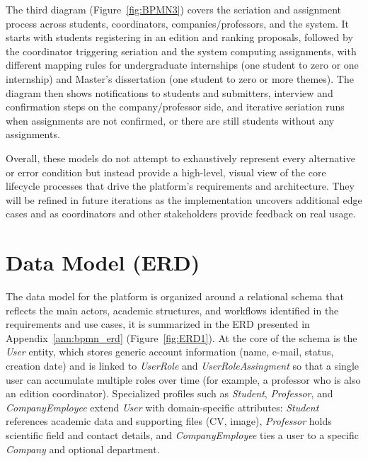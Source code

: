     {
        The third diagram (Figure~\ref{fig:BPMN3}) covers the seriation and assignment process across students, coordinators, companies/professors,
        and the system. 
        It starts with students registering in an edition and ranking proposals, followed by the coordinator triggering
        seriation and the system computing assignments, with different mapping rules for undergraduate internships 
        (one student to zero or one internship) and Master's dissertation (one student to zero or more themes).
        The diagram then shows notifications to students and submitters, interview and confirmation steps on the
        company/professor side, and iterative seriation runs when assignments are not confirmed, or there are still students
        without any assignments.
    }

    {
        Overall, these  models do not attempt to exhaustively represent every alternative or error condition but instead
        provide a high-level, visual view of the core lifecycle processes that drive the platform's requirements and architecture.
        They will be refined in future iterations as the implementation uncovers additional edge cases and 
        as coordinators and other stakeholders provide feedback on real usage. 
    }

\section{Data Model (ERD)}
\label{sec:sol_erd}
\ntindex[Template]{}
    {
        The data model for the platform is organized around a relational schema that reflects the main actors, academic structures, and workflows
        identified in the requirements and use cases, it is summarized in the \gls{ERD} presented in Appendix~\ref{ann:bpmn_erd} (Figure~\ref{fig:ERD1}).
        At the core of the schema is the \textit{User} entity, which stores generic account information (name, e-mail, status, creation date)
        and is linked to \textit{UserRole} and \textit{UserRoleAssingment} so that a single user can accumulate multiple roles over time 
        (for example, a professor who is also an edition coordinator). 
        Specialized profiles such as \textit{Student}, \textit{Professor}, and \textit{CompanyEmployee} extend \textit{User} with domain-specific attributes:
        \textit{Student} references academic data and supporting files (CV, image),
        \textit{Professor} holds scientific field and contact details, and \textit{CompanyEmployee} ties a user to a specific \textit{Company} and optional department.
    }

